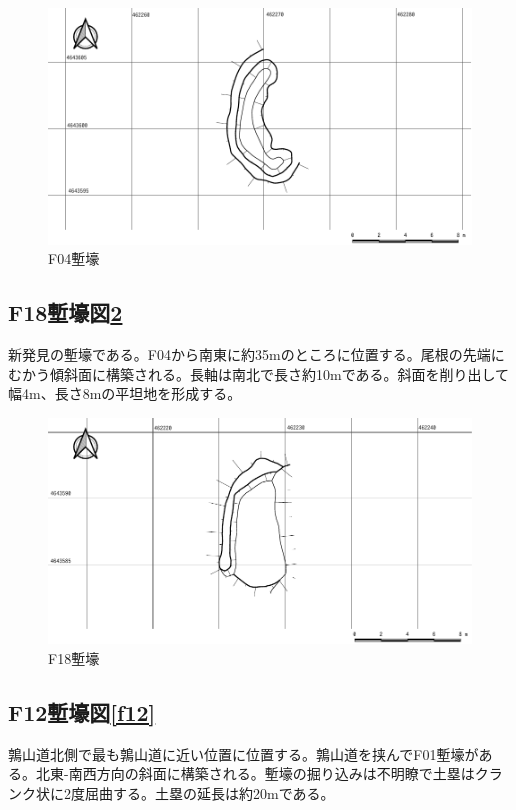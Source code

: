 \documentclass[14Q]{jsarticle}
\begin{document}
\begin{figure}[h]
\centering
\includegraphics[width=160truemm]{fig/F04.pdf}
\caption{F04塹壕}
\label{f04}
\end{figure}

\subsection{F18塹壕図\ref{f18}}
新発見の塹壕である。F04から南東に約35mのところに位置する。尾根の先端にむかう傾斜面に構築される。長軸は南北で長さ約10mである。斜面を削り出して幅4m、長さ8mの平坦地を形成する。

\begin{figure}[h]
\centering
\includegraphics[width=160truemm]{fig/F18.pdf}
\caption{F18塹壕}
\label{f18}
\end{figure}

\subsection{F12塹壕図\ref{f12}}
鶉山道北側で最も鶉山道に近い位置に位置する。鶉山道を挟んでF01塹壕がある。北東-南西方向の斜面に構築される。塹壕の掘り込みは不明瞭で土塁はクランク状に2度屈曲する。土塁の延長は約20mである。
\end{document}
